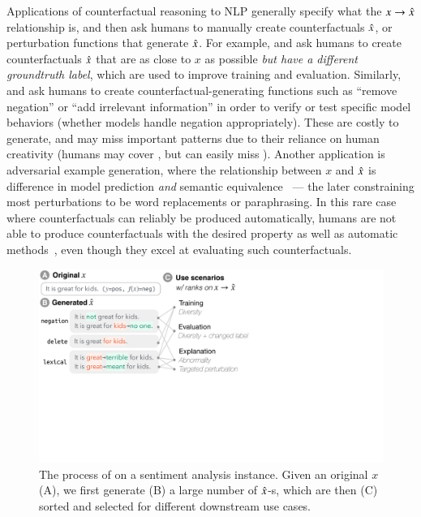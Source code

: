 Applications of counterfactual reasoning to NLP generally specify what the $x \rightarrow \hat{x}$ relationship is, and then ask humans to manually create counterfactuals $\hat{x}$, or perturbation functions that generate $\hat{x}$.
For example, \citet{gardner2020contrast} and \citet{kaushik2019learning} ask humans to create counterfactuals $\hat{x}$ that are as close to $x$ as possible \emph{but have a different groundtruth label}, which are used to improve training and evaluation. 
Similarly, \citet{wu2019errudite} and \citet{checklist:acl20} ask humans to create counterfactual-generating functions such as ``remove negation'' or ``add irrelevant information'' in order to verify or test specific model behaviors (\eg whether models handle negation appropriately).
These are costly to generate, and may miss important patterns due to their reliance on human creativity (\eg humans may cover , but can easily miss ).
Another application is adversarial example generation, where the relationship between $x$ and $\hat{x}$ is difference in model prediction \emph{and} semantic equivalence~\cite{iyyer2018adversarial, ribeiro2018semantically} --- the later constraining most perturbations to be word replacements or paraphrasing.
In this rare case where counterfactuals can reliably be produced automatically, humans are not able to produce counterfactuals with the desired property as well as automatic methods~\cite{ribeiro2018semantically}, even though they excel at evaluating such counterfactuals.

\begin{figure}[t]
\centering
\includegraphics[trim={0 17cm 26cm 0cm},clip, width=1\columnwidth]{figures/teaser}
\vspace{-15pt}
\caption{
The process of \sysname on a sentiment analysis instance.
Given an original $x$ (A), we first generate (B) a large number of $\hat{x}$-s, which are then (C) sorted and selected for different downstream use cases.}
\vspace{-15pt}
\label{fig:teaser}
\end{figure} 
 

